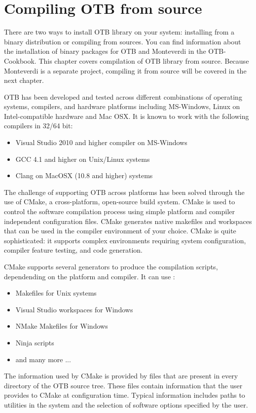 \setcounter{secnumdepth}{3}

\chapter{Compiling OTB from source}
\label{chapter:Installation}

There are two ways to install OTB library on your system: installing from a binary distribution or compiling from sources. 
You can find information about the installation of binary packages for OTB and Monteverdi in the OTB-Cookbook.
This chapter covers compilation of OTB library from source.
Because Monteverdi is a separate project, compiling it from source will be covered in the next chapter.

OTB has been developed and tested across different combinations of operating systems, compilers, and hardware platforms including MS-Windows, Linux on Intel-compatible hardware and Mac OSX.  It is known to work with the following compilers in 32/64 bit:
\begin{itemize}
\item Visual Studio 2010 and higher compiler on MS-Windows
\item GCC 4.1 and higher on Unix/Linux systems
\item Clang on MacOSX (10.8 and higher) systems
\end{itemize}

The challenge of supporting OTB across platforms has been solved through the use of CMake, a cross-platform, open-source
build system. CMake is used to control the software compilation process using simple platform and compiler independent
configuration files.  CMake generates native makefiles and workspaces that can be used in the compiler environment of
your choice. CMake is quite sophisticated: it supports complex environments requiring system configuration, compiler
feature testing, and code generation.

CMake supports several generators to produce the compilation scripts, dependending on the platform and compiler. It can use :
\begin{itemize}
\item Makefiles for Unix systems
\item Visual Studio workspaces for Windows
\item NMake Makefiles for Windows
\item Ninja scripts
\item and many more ...
\end{itemize}
The information used by CMake is provided by  files that
are present in every directory of the OTB source tree. These files contain information that the user provides to CMake
at configuration time. Typical information includes paths to utilities in the system and the selection of software
options specified by the user.

